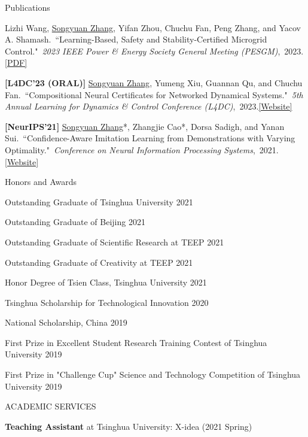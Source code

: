 \documentclass{resume} %
\newcommand{\paperItem}[4]{#1.~``#2."~\textit{#3},~#4.}%
\newcommand{\me}{\underline{Songyuan Zhang}}
\newcommand{\meshort}{\textbf{S. Zhang}}
\newcommand{\person}[2]{#1}
\begin{document}
\begin{rSection}{Publications}
{			\paperItem{\person{Lizhi Wang}{L. Wang}, \person{\me}{\meshort}, \person{Yifan Zhou}{Y. Zhou}, \person{Chuchu Fan}{C. Fan}, \person{Peng Zhang}{P. Zhang}, and \person{Yacov A. Shamash}{YA. Shamash}}{Learning-Based, Safety and Stability-Certified Microgrid Control}{2023 IEEE Power \& Energy Society General Meeting (PESGM)}{2023}{\href{https://ieeexplore.ieee.org/stamp/stamp.jsp?arnumber=10253396}{[PDF]}}
			\item {\bf [L4DC'23 (ORAL)]}
			\paperItem{\person{\me}{\meshort}, \person{Yumeng Xiu}{Y. Xiu}, \person{Guannan Qu}{G. Qu}, and \person{Chuchu Fan}{C. Fan}}{Compositional Neural Certificates for Networked Dynamical Systems}{5th Annual Learning for Dynamics \& Control Conference (L4DC)}{2023}{\href{https://mit-realm.github.io/neuriss-website/}{[Website]}}
			\item {\bf [NeurIPS'21]}
			\paperItem{\person{\me*}{\meshort}, \person{Zhangjie Cao*}{Z. Cao}, \person{Dorsa Sadigh}{D. Sadigh}, and \person{Yanan Sui}{Y. Sui}}{Confidence-Aware Imitation Learning from Demonstrations with Varying Optimality}{Conference on Neural Information Processing Systems}{2021}{\href{https://sites.google.com/view/cail/}{[Website]}}
		}
	\end{rSection}

	\begin{rSection}{Honors and Awards} {} \itemsep -2pt {}  
		\item Outstanding Graduate of Tsinghua University \hfill{2021}
		\item Outstanding Graduate of Beijing \hfill{2021}
		\item Outstanding Graduate of Scientific Research at TEEP \hfill{2021}
		\item Outstanding Graduate of Creativity at TEEP \hfill{2021}
		\item Honor Degree of Tsien Class, Tsinghua University \hfill{2021}
		\item Tsinghua Scholarship for Technological Innovation \hfill{2020}
		\item National Scholarship, China \hfill{2019}
		\item First Prize in Excellent Student Research Training Contest of Tsinghua University \hfill{2019}
		\item First Prize in "Challenge Cup" Science and Technology Competition of Tsinghua University \hfill{2019}
	\end{rSection}

	\begin{rSection}{ACADEMIC SERVICES}
		\item \textbf{Teaching Assistant} at Tsinghua University: X-idea (2021 Spring)
	\end{rSection}
\end{document}
